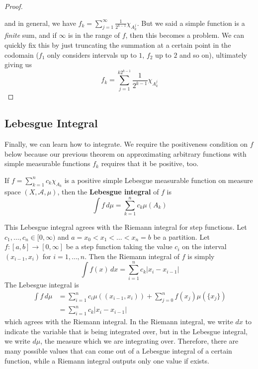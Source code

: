\begin{proof}
\begin{center}
    \end{center}
    and in general, we have $f_k = \sum_{j=1}^\infty \frac{1}{2^{k-1}} \chi_{A^j_k}$. But we said a simple function is a \textit{finite} sum, and if $\infty$ is in the range of $f$, then this becomes a problem. We can quickly fix this by just truncating the summation at a certain point in the codomain ($f_1$ only considers intervals up to $1$, $f_2$ up to $2$ and so on), ultimately giving us 
    \begin{equation}
      f_k = \sum_{j=1}^{k 2^{k-1}} \frac{1}{2^{k-1}} \chi_{A^j_k} 
    \end{equation}
  \end{proof}

\subsection{Lebesgue Integral}

  Finally, we can learn how to integrate. We require the positiveness condition on $f$ below because our previous theorem on approximating arbitrary functions with simple measurable functions $f_k$ requires that it be positive, too. 

  \begin{definition}
    If $f = \sum_{k=1}^n c_k \chi_{A_k}$ is a positive simple Lebesgue measurable function on measure space $(X, \mathcal{A}, \mu)$, then the \textbf{Lebesgue integral} of $f$ is 
    \begin{equation}
      \int f \, d\mu = \sum_{k=1}^n c_k \mu(A_k)
    \end{equation}
  \end{definition}

  This Lebesgue integral agrees with the Riemann integral for step functions. Let $c_1, \ldots, c_n \in [0, \infty)$ and $a = x_0 < x_1 < \ldots < x_n = b$ be a partition. Let $f: [a, b] \longrightarrow [0, \infty]$ be a step function taking the value $c_i$ on the interval $(x_{i-1}, x_i)$ for $i = 1, \ldots, n$. Then the Riemann integral of $f$ is simply 
  \begin{equation}
    \int f(x) \,dx = \sum_{i=1}^n c_k |x_i - x_{i-1}|
  \end{equation}
  The Lebesgue integral is 
  \begin{align*}
    \int f \, d \mu & = \sum_{i=1}^n c_i \mu((x_{i-1}, x_i)) + \sum_{j=0}^n f(x_j) \mu(\{x_j\}) \\
    & = \sum_{i=1}^n c_k |x_i - x_{i-1}|
  \end{align*}
  which agrees with the Riemann integral. In the Riemann integral, we write $dx$ to indicate the variable that is being integrated over, but in the Lebesgue integral, we write $d \mu$, the measure which we are integrating over. Therefore, there are many possible values that can come out of a Lebesgue integral of a certain function, while a Riemann integral outputs only one value if exists. 

